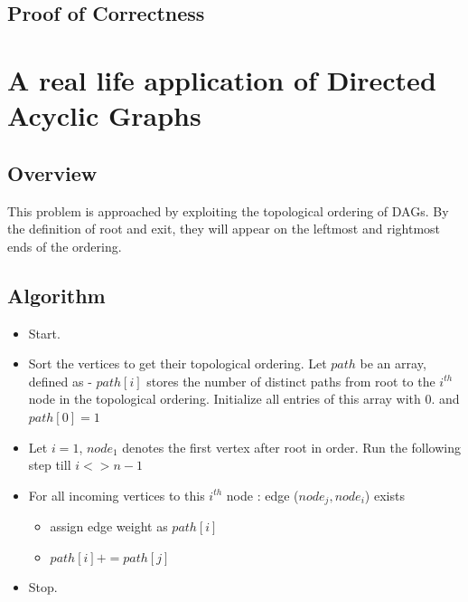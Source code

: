\documentclass{article}
\begin{document}
\subsection{Proof of Correctness}

\newpage
\section{A real life application of Directed Acyclic Graphs}
\subsection{Overview}
This problem is approached by exploiting the topological ordering of DAGs. By the definition of root and exit, they will appear on the leftmost and rightmost ends of the ordering.
\subsection{Algorithm}
\begin{itemize}
\item Start.
\item Sort the vertices to get their topological ordering. Let $path$ be an array, defined as - $path[i]$ stores the number of distinct paths from root to the $i^{th}$ node in the topological ordering. Initialize all entries of this array with $0$. and $path[0] = 1$
\item Let $i=1$, $node_1$ denotes the first vertex after root in order. Run the following step till $i <> n-1$
\item For all incoming vertices to this $i^{th}$ node : edge ($node_j, node_i$) exists
\begin{itemize}
\item assign edge weight as $path[i]$
\item $path[i] += path[j]$
\end{itemize} 
\item Stop.
\end{itemize}
\end{document}
